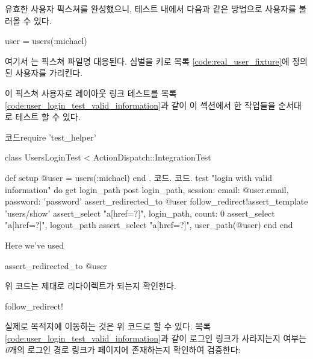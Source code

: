 유효한 사용자 픽스쳐를 완성했으니, 테스트 내에서 다음과 같은 방법으로 사용자를 불러올 수 있다. 

\begin{code} user = users(:michael) \end{code} 

\noindent 여기서 는 픽스쳐 파일명  대응된다.  심벌을 키로 목록 \ref{code:real_user_fixture}에 정의된 사용자를 가리킨다.  

이 픽스쳐 사용자로 레이아웃 링크 테스트를 목록 \ref{code:user_login_test_valid_information}과 같이 이 섹션에서 한 작업들을 순서대로 테스트 할 수 있다. 

\begin{codelisting} \label{code:user_login_test_valid_information}  

\begin{code} 코드require 'test_helper' 

class UsersLoginTest < ActionDispatch::IntegrationTest 

def setup @user = users(:michael) end . 코드. 코드. test "login with valid information" do get login_path post login_path, session: { email: @user.email, password: 'password' } assert_redirected_to @user follow_redirect!assert_template 'users/show' assert_select "a[href=?]", login_path, count: 0 assert_select "a[href=?]", logout_path assert_select "a[href=?]", user_path(@user) end end \end{code} \end{codelisting} 

\noindent Here we've used 

\begin{code} assert_redirected_to @user \end{code} 

\noindent 위 코드는 제대로 리다이렉트가 되는지 확인한다. 

\begin{code} follow_redirect! \end{code} 

\noindent 실제로 목적지에 이동하는 것은 위 코드로 할 수 있다. 목록 \ref{code:user_login_test_valid_information}과 같이 로그인 링크가 사라지는지 여부는 \emph{0}개의 로그인 경로 링크가 페이지에 존재하는지 확인하여 검증한다: 

